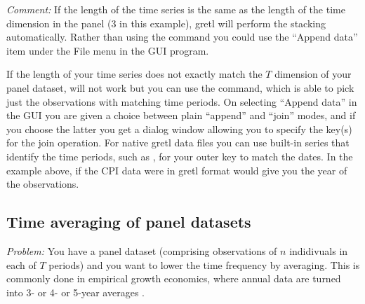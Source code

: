 \emph{Comment:} If the length of the time series is the same as the
length of the time dimension in the panel (3 in this example), gretl
will perform the stacking automatically.  Rather than using the
 command you could use the ``Append data'' item under
the \textsf{File} menu in the GUI program.

If the length of your time series does not exactly match the $T$
dimension of your panel dataset,  will not work but you
can use the  command, which is able to pick just the
observations with matching time periods. On selecting ``Append data''
in the GUI you are given a choice between plain ``append'' and
``join'' modes, and if you choose the latter you get a dialog window
allowing you to specify the key(s) for the join operation. For native
gretl data files you can use built-in series that identify the time
periods, such as , for your outer key to match the
dates. In the example above, if the CPI data were in gretl format
 would give you the year of the observations.

\subsection{Time averaging of panel datasets}

\emph{Problem:} You have a panel dataset (comprising observations of
$n$ indidivuals in each of $T$ periods) and you want to lower the time
frequency by averaging. This is commonly done in empirical growth
economics, where annual data are turned into 3- or 4- or 5-year
averages \citep[see for example][]{Islam1995}.

